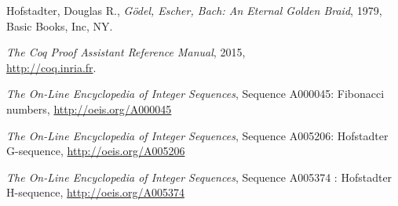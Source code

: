 \documentclass[a4paper,11pt]{article}
\begin{document}
\begin{thebibliography}{1}
 Hofstadter, Douglas R.,
 {\it Gödel, Escher, Bach: An Eternal Golden Braid},
 1979, Basic Books, Inc, NY.

 {\it The Coq Proof Assistant Reference Manual}, 2015,\\
 \mbox{\url{http://coq.inria.fr}}.

 {\it The On-Line Encyclopedia of Integer Sequences}, Sequence
 A000045: Fibonacci numbers, \url{http://oeis.org/A000045}

 {\it The On-Line Encyclopedia of Integer Sequences}, Sequence
 A005206: Hofstadter G-sequence, \url{http://oeis.org/A005206}

 {\it The On-Line Encyclopedia of Integer Sequences}, Sequence
 A005374 : Hofstadter H-sequence, \url{http://oeis.org/A005374}

\end{thebibliography}
\end{document}
